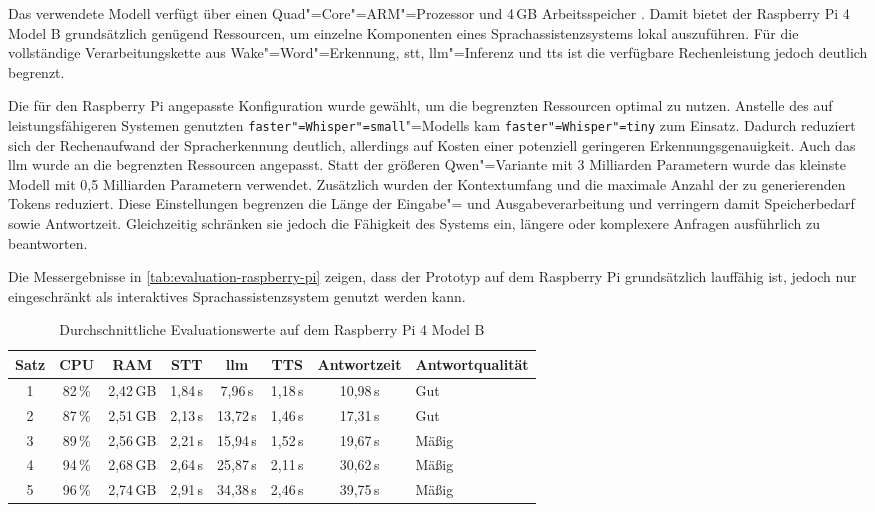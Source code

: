 Das verwendete Modell verfügt über einen Quad"=Core"=ARM"=Prozessor und 4\,GB Arbeitsspeicher \autocite{RaspberryPi4ModelB-Documentation}. Damit bietet der Raspberry Pi 4 Model B grundsätzlich genügend Ressourcen, um einzelne Komponenten eines Sprachassistenzsystems lokal auszuführen. Für die vollständige Verarbeitungskette aus Wake"=Word"=Erkennung, \gls{stt}, \gls{llm}"=Inferenz und \gls{tts} ist die verfügbare Rechenleistung jedoch deutlich begrenzt.

Die für den Raspberry Pi angepasste Konfiguration wurde gewählt, um die begrenzten Ressourcen optimal zu nutzen. Anstelle des auf leistungsfähigeren Systemen genutzten \texttt{faster"=Whisper"=small}"=Modells kam \texttt{faster"=Whisper"=tiny} zum Einsatz. Dadurch reduziert sich der Rechenaufwand der Spracherkennung deutlich, allerdings auf Kosten einer potenziell geringeren Erkennungsgenauigkeit. Auch das \gls{llm} wurde an die begrenzten Ressourcen angepasst. Statt der größeren Qwen"=Variante mit 3 Milliarden Parametern wurde das kleinste Modell mit 0,5 Milliarden Parametern verwendet. Zusätzlich wurden der Kontextumfang und die maximale Anzahl der zu generierenden Tokens reduziert. Diese Einstellungen begrenzen die Länge der Eingabe"= und Ausgabeverarbeitung und verringern damit Speicherbedarf sowie Antwortzeit. Gleichzeitig schränken sie jedoch die Fähigkeit des Systems ein, längere oder komplexere Anfragen ausführlich zu beantworten.

Die Messergebnisse in \autoref{tab:evaluation-raspberry-pi} zeigen, dass der Prototyp auf dem Raspberry Pi grundsätzlich lauffähig ist, jedoch nur eingeschränkt als interaktives Sprachassistenzsystem genutzt werden kann.

\begin{table}[H]
  \centering
  \caption{Durchschnittliche Evaluationswerte auf dem Raspberry Pi 4 Model B}
  \label{tab:evaluation-raspberry-pi}
  \small
  \begin{tabular}{c c c c c c c l}
    \toprule
    \textbf{Satz}        &
    \textbf{CPU}         &
    \textbf{RAM}         &
    \textbf{STT}         &
    \textbf{\gls{llm}}   &
    \textbf{TTS}         &
    \textbf{Antwortzeit} &
    \textbf{Antwortqualität}                                                                   \\
    \midrule
    1                    & 82\,\% & 2,42\,GB & 1,84\,s & 7,96\,s  & 1,18\,s & 10,98\,s & Gut   \\
    2                    & 87\,\% & 2,51\,GB & 2,13\,s & 13,72\,s & 1,46\,s & 17,31\,s & Gut   \\
    3                    & 89\,\% & 2,56\,GB & 2,21\,s & 15,94\,s & 1,52\,s & 19,67\,s & Mäßig \\
    4                    & 94\,\% & 2,68\,GB & 2,64\,s & 25,87\,s & 2,11\,s & 30,62\,s & Mäßig \\
    5                    & 96\,\% & 2,74\,GB & 2,91\,s & 34,38\,s & 2,46\,s & 39,75\,s & Mäßig \\
    \bottomrule
  \end{tabular}
\end{table}

